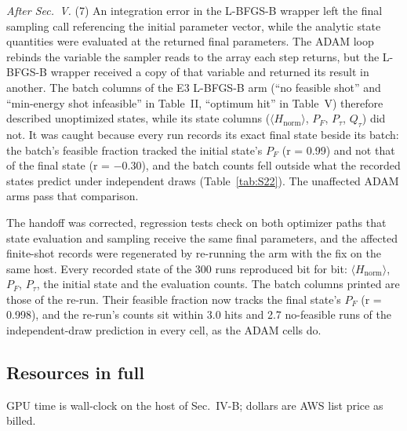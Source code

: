 \documentclass[journal]{IEEEtran}
\begin{document}
\textit{After Sec.~V.} (7) An integration error in the L-BFGS-B wrapper left the final sampling call referencing the initial parameter vector, while the analytic state quantities were evaluated at the returned final parameters. The ADAM loop rebinds the variable the sampler reads to the array each step returns, but the L-BFGS-B wrapper received a copy of that variable and returned its result in another. The batch columns of the E3 L-BFGS-B arm (``no feasible shot'' and ``min-energy shot infeasible'' in Table~II, ``optimum hit'' in Table~V) therefore described unoptimized states, while its state columns ($\langle$$H_{\mathrm{norm}}$$\rangle$, $P_{F}$, $P_{\tau}$, $Q_{\tau}$) did not. It was caught because every run records its exact final state beside its batch: the batch's feasible fraction tracked the initial state's $P_{F}$ (r = 0.99) and not that of the final state (r = $-$0.30), and the batch counts fell outside what the recorded states predict under independent draws (Table~\ref{tab:S22}). The unaffected ADAM arms pass that comparison.


The handoff was corrected, regression tests check on both optimizer paths that state evaluation and sampling receive the same final parameters, and the affected finite-shot records were regenerated by re-running the arm with the fix on the same host. Every recorded state of the 300 runs reproduced bit for bit: $\langle$$H_{\mathrm{norm}}$$\rangle$, $P_{F}$, $P_{\tau}$, the initial state and the evaluation counts. The batch columns printed are those of the re-run. Their feasible fraction now tracks the final state's $P_{F}$ (r = 0.998), and the re-run's counts sit within 3.0 hits and 2.7 no-feasible runs of the independent-draw prediction in every cell, as the ADAM cells do.


\subsection{Resources in full}


GPU time is wall-clock on the host of Sec.~IV-B; dollars are AWS list price as billed.
\end{document}
